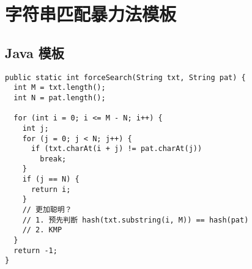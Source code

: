 \newpage
\section{字符串匹配暴力法模板}

\subsection{Java 模板}

\begin{verbatim}
public static int forceSearch(String txt, String pat) {
  int M = txt.length();
  int N = pat.length();

  for (int i = 0; i <= M - N; i++) {
    int j;
    for (j = 0; j < N; j++) {
      if (txt.charAt(i + j) != pat.charAt(j))
        break;
    }
    if (j == N) {
      return i;
    }
    // 更加聪明？
    // 1. 预先判断 hash(txt.substring(i, M)) == hash(pat)
    // 2. KMP
  }
  return -1;
}
\end{verbatim}
